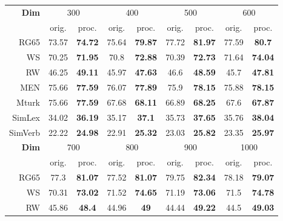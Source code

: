 \documentclass{article} \usepackage{acl2017,times}
\begin{document}
\begin{table}[!h]
\centering
\begin{tabular}{|r|c|c|c|c|c|c|c|c|}
\hline
\multirow{2}{*}{\bf Dim} & \multicolumn{2}{c|}{300} & \multicolumn{2}{c|}{400} & \multicolumn{2}{c|}{500} & \multicolumn{2}{c|}{600}  \\ \cline{2-9} 
                         & orig.  & proc.           & orig.  & proc.           & orig.  & proc.           & orig.   & proc.           \\ \hline
RG65                     & 73.57  & \textbf{74.72}  & 75.64  & \textbf{79.87}  & 77.72  & \textbf{81.97}  & 77.59   & \textbf{80.7}   \\ \hline
WS                       & 70.25  & \textbf{71.95}  & 70.8   & \textbf{72.88}  & 70.39  & \textbf{72.73}  & 71.64   & \textbf{74.04}  \\ \hline
RW                       & 46.25  & \textbf{49.11}  & 45.97  & \textbf{47.63}  & 46.6   & \textbf{48.59}  & 45.7    & \textbf{47.81}  \\ \hline
MEN                      & 75.66  & \textbf{77.59}  & 76.07  & \textbf{77.89}  & 75.9   & \textbf{78.15}  & 75.88   & \textbf{78.15}  \\ \hline
Mturk                    & 75.66  & \textbf{77.59}  & 67.68  & \textbf{68.11}  & 66.89  & \textbf{68.25}  & 67.6    & \textbf{67.87}  \\ \hline
SimLex                   & 34.02  & \textbf{36.19}  & 35.17  & \textbf{37.1}   & 35.73  & \textbf{37.65}  & 35.76   & \textbf{38.04}  \\ \hline
SimVerb                  & 22.22  & \textbf{24.98}  & 22.91  & \textbf{25.32}  & 23.03  & \textbf{25.82}  & 23.35   & \textbf{25.97}  \\ \hline
\multirow{2}{*}{\bf Dim} & \multicolumn{2}{c|}{700} & \multicolumn{2}{c|}{800} & \multicolumn{2}{c|}{900} & \multicolumn{2}{c|}{1000} \\ \cline{2-9} 
                         & orig.  & proc.           & orig.  & proc.           & orig.  & proc.           & orig.   & proc.           \\ \hline
RG65                     & 77.3   & \textbf{81.07}  & 77.52  & \textbf{81.07}  & 79.75  & \textbf{82.34}  & 78.18   & \textbf{79.07}  \\ \hline
WS                       & 70.31  & \textbf{73.02}  & 71.52  & \textbf{74.65}  & 71.19  & \textbf{73.06}  & 71.5    & \textbf{74.78}  \\ \hline
RW                       & 45.86  & \textbf{48.4}   & 44.96  & \textbf{49}     & 44.44  & \textbf{49.22}  & 44.5    & \textbf{49.03}  \\ \hline

\end{tabular}
\end{table}
\end{document}

